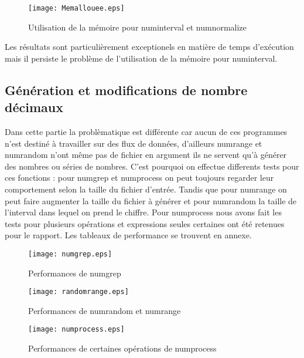 \begin{figure}[h]
\begin{center}
\texttt{[image: Memallouee.eps]}
\end{center}
\caption{Utilisation de la m\'emoire pour numinterval et numnormalize}
\end{figure}

Les r\'esultats sont particuli\`erement exceptionels en mati\`ere de temps d'ex\'ecution mais il persiste le probl\`eme de l'utilisation de la
 m\'emoire pour numinterval.
\newline

\subsection{G\'en\'eration et modifications de nombre d\'ecimaux}

Dans cette partie la probl\`ematique est diff\'erente car aucun de ces programmes n'est destin\'e \`a travailler sur des flux de donn\'ees, 
d'ailleurs numrange et numrandom n'ont m\^eme pas de fichier en argument ils ne servent qu'\`a g\'en\'erer des nombres ou s\'eries de nombres.
C'est pourquoi on effectue differents tests pour ces fonctions : pour numgrep et numprocess on peut toujours regarder leur comportement selon la taille du fichier d'entr\'ee.
Tandis que pour numrange on peut faire augmenter la taille du fichier à g\'en\'erer et pour numrandom la taille de l'interval dans lequel on prend le chiffre.
Pour numprocess nous avons fait les tests pour plusieurs op\'erations et expressions seules certaines ont été retenues pour le rapport.
Les tableaux de performance se trouvent en annexe.

\begin{figure}[h]
\begin{center}
\texttt{[image: numgrep.eps]}
\end{center}
\caption{Performances de numgrep}
\end{figure}

\begin{figure}[h]
\begin{center}
\texttt{[image: randomrange.eps]}
\end{center}
\caption{Performances de numrandom et numrange}
\end{figure}

\begin{figure}[h]
\begin{center}
\texttt{[image: numprocess.eps]}
\end{center}
\caption{Performances de certaines opérations de numprocess}
\end{figure}

